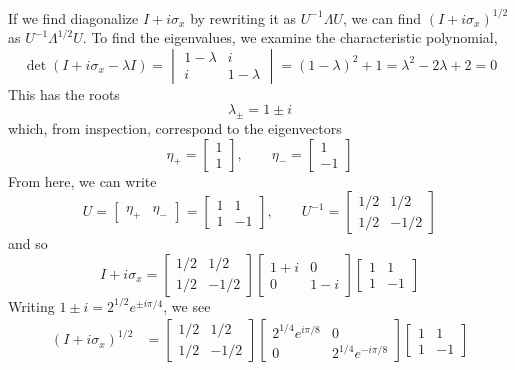 \documentclass[../principles-of-quantum-mechanics.tex]{subfiles}
\begin{document}
\begin{questions}
		\begin{solution}
			If we find diagonalize $I + i\sigma_x$ by rewriting it as $U^{-1}\Lambda U$, we can find $(I + i\sigma_x)^{1/2}$ as $U^{-1}\Lambda^{1/2}U$. To find the eigenvalues, we examine the characteristic polynomial,
			$$\det(I + i\sigma_x - \lambda I) = \begin{vmatrix}1 - \lambda & i \\ i & 1 - \lambda\end{vmatrix} = (1 - \lambda)^2 + 1 = \lambda^2 - 2\lambda + 2 = 0$$
			This has the roots
			$$\lambda_{\pm} = 1 \pm i$$
			which, from inspection, correspond to the eigenvectors
			$$\eta_+ = \begin{bmatrix}1 \\ 1\end{bmatrix}, \qquad \eta_- = \begin{bmatrix}1 \\ {-1}\end{bmatrix}$$
			From here, we can write
			$$U = \begin{bmatrix}\eta_+ & \eta_-\end{bmatrix} = \begin{bmatrix}1 & 1 \\ 1 & -1\end{bmatrix}, \qquad U^{-1} = \begin{bmatrix}1/2 & 1/2 \\ 1/2 & -1/2\end{bmatrix}$$
			and so
			$$I + i\sigma_x = \begin{bmatrix}1/2 & 1/2 \\ 1/2 & -1/2\end{bmatrix}\begin{bmatrix}1 + i & 0 \\ 0 & 1 - i\end{bmatrix}\begin{bmatrix}1 & 1 \\ 1 & -1\end{bmatrix}$$
			Writing $1 \pm i = 2^{1/2}e^{\pm i\pi/4}$, we see
			\begin{align*}
				(I + i\sigma_x)^{1/2} &= \begin{bmatrix}1/2 & 1/2 \\ 1/2 & -1/2\end{bmatrix}\begin{bmatrix}2^{1/4}e^{i\pi/8} & 0 \\ 0 & 2^{1/4}e^{-i\pi/8}\end{bmatrix}\begin{bmatrix}1 & 1 \\ 1 & -1\end{bmatrix} \\

\end{align*}
\end{solution}
\end{questions}
\end{document}
